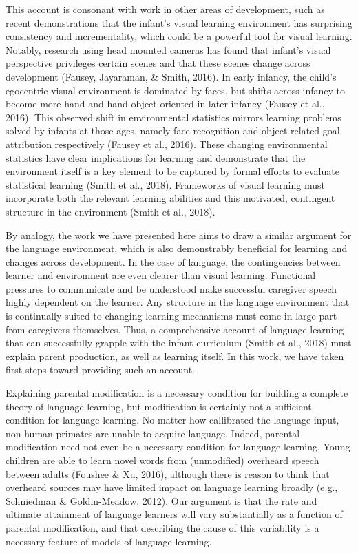 \documentclass[english,,man,floatsintext]{apa6}
\begin{document}
This account is consonant with work in other areas of development, such as recent demonstrations that the infant's visual learning environment has surprising consistency and incrementality, which could be a powerful tool for visual learning. Notably, research using head mounted cameras has found that infant's visual perspective privileges certain scenes and that these scenes change across development (Fausey, Jayaraman, \& Smith, 2016). In early infancy, the child's egocentric visual environment is dominated by faces, but shifts across infancy to become more hand and hand-object oriented in later infancy (Fausey et al., 2016). This observed shift in environmental statistics mirrors learning problems solved by infants at those ages, namely face recognition and object-related goal attribution respectively (Fausey et al., 2016). These changing environmental statistics have clear implications for learning and demonstrate that the environment itself is a key element to be captured by formal efforts to evaluate statistical learning (Smith et al., 2018). Frameworks of visual learning must incorporate both the relevant learning abilities and this motivated, contingent structure in the environment (Smith et al., 2018).

By analogy, the work we have presented here aims to draw a similar argument for the language environment, which is also demonstrably beneficial for learning and changes across development. In the case of language, the contingencies between learner and environment are even clearer than visual learning. Functional pressures to communicate and be understood make successful caregiver speech highly dependent on the learner. Any structure in the language environment that is continually suited to changing learning mechanisms must come in large part from caregivers themselves. Thus, a comprehensive account of language learning that can successfully grapple with the infant curriculum (Smith et al., 2018) must explain parent production, as well as learning itself. In this work, we have taken first steps toward providing such an account.

Explaining parental modification is a necessary condition for building a complete theory of language learning, but modification is certainly not a sufficient condition for language learning. No matter how callibrated the language input, non-human primates are unable to acquire language. Indeed, parental modification need not even be a necessary condition for language learning. Young children are able to learn novel words from (unmodified) overheard speech between adults (Foushee \& Xu, 2016), although there is reason to think that overheard sources may have limited impact on language learning broadly (e.g., Schniedman \& Goldin-Meadow, 2012). Our argument is that the rate and ultimate attainment of language learners will vary substantially as a function of parental modification, and that describing the cause of this variability is a necessary feature of models of language learning.
\end{document}
